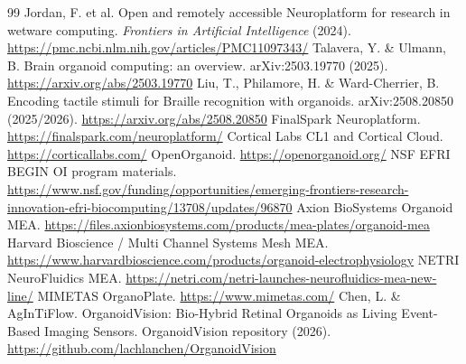 \documentclass[10pt,twocolumn]{article}
\begin{document}
\begin{thebibliography}{99}
 Jordan, F. et al. Open and remotely accessible Neuroplatform for research in wetware computing. \emph{Frontiers in Artificial Intelligence} (2024). \url{https://pmc.ncbi.nlm.nih.gov/articles/PMC11097343/}
 Talavera, Y. \& Ulmann, B. Brain organoid computing: an overview. arXiv:2503.19770 (2025). \url{https://arxiv.org/abs/2503.19770}
 Liu, T., Philamore, H. \& Ward-Cherrier, B. Encoding tactile stimuli for Braille recognition with organoids. arXiv:2508.20850 (2025/2026). \url{https://arxiv.org/abs/2508.20850}
 FinalSpark Neuroplatform. \url{https://finalspark.com/neuroplatform/}
 Cortical Labs CL1 and Cortical Cloud. \url{https://corticallabs.com/}
 OpenOrganoid. \url{https://openorganoid.org/}
 NSF EFRI BEGIN OI program materials. \url{https://www.nsf.gov/funding/opportunities/emerging-frontiers-research-innovation-efri-biocomputing/13708/updates/96870}
 Axion BioSystems Organoid MEA. \url{https://files.axionbiosystems.com/products/mea-plates/organoid-mea}
 Harvard Bioscience / Multi Channel Systems Mesh MEA. \url{https://www.harvardbioscience.com/products/organoid-electrophysiology}
 NETRI NeuroFluidics MEA. \url{https://netri.com/netri-launches-neurofluidics-mea-new-line/}
 MIMETAS OrganoPlate. \url{https://www.mimetas.com/}
 Chen, L. \& AgInTiFlow. OrganoidVision: Bio-Hybrid Retinal Organoids as Living Event-Based Imaging Sensors. OrganoidVision repository (2026). \url{https://github.com/lachlanchen/OrganoidVision}

\end{thebibliography}
\end{document}

